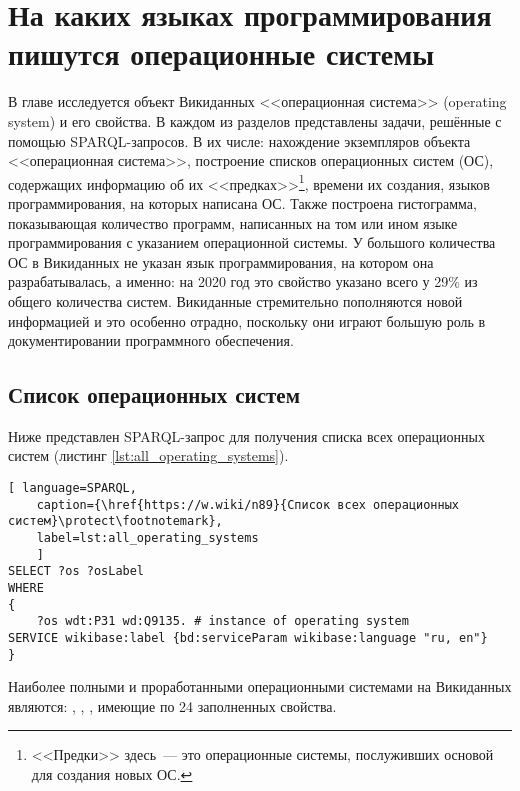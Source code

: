 \chapter{На каких языках программирования пишутся операционные системы}
\label{ch:operating-sysmets}

В главе исследуется объект Викиданных <<операционная система>> (operating system) и его свойства. В каждом из разделов представлены задачи, решённые с помощью SPARQL-запросов. В их числе: нахождение экземпляров объекта <<операционная система>>, 
построение списков операционных систем (ОС), содержащих информацию 
об их <<предках>>\footnote{<<Предки>> здесь~--- это операционные системы, послуживших основой для создания новых ОС.}, 
времени их создания, языков программирования, на которых написана ОС. 
Также построена гистограмма, показывающая количество программ, написанных на том или ином языке программирования 
с указанием операционной системы. 
У большого количества ОС в Викиданных не указан язык программирования, 
на котором она разрабатывалась, а именно: на 2020 год это свойство указано всего у 29\% из общего количества систем. 
Викиданные стремительно пополняются новой информацией и это особенно отрадно, поскольку они играют большую роль в документировании программного обеспечения.

\section{Список операционных систем}
Ниже представлен SPARQL-запрос для получения списка всех операционных систем (листинг \ref{lst:all_operating_systems}).

\begin{lstlisting}[ language=SPARQL, 
	caption={\href{https://w.wiki/n89}{Список всех операционных систем}\protect\footnotemark},
	label=lst:all_operating_systems
	]
SELECT ?os ?osLabel
WHERE
{
	?os wdt:P31 wd:Q9135. # instance of operating system
SERVICE wikibase:label {bd:serviceParam wikibase:language "ru, en"}
}
\end{lstlisting}

Наиболее полными и проработанными операционными системами на Викиданных являются:  , , , имеющие по 24 заполненных свойства\autocite{prowd_os_link}.

